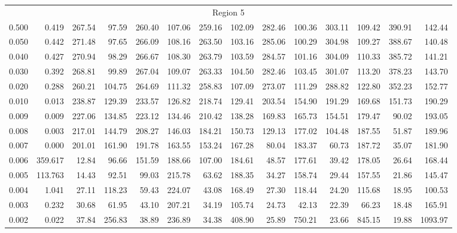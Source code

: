\begin{tabular}{@{}lrrrrrrrrrrrrr@{}}
\midrule
\multicolumn{14}{c}{Region 5} \\
\cmidrule{1-14}
0.500 & 0.419 & 267.54 & 97.59 & 260.40 & 107.06 & 259.16 & 102.09 & 282.46 & 100.36 & 303.11 & 109.42 & 390.91 & 142.44 \\
0.050 & 0.442 & 271.48 & 97.65 & 266.09 & 108.16 & 263.50 & 103.16 & 285.06 & 100.29 & 304.98 & 109.27 & 388.67 & 140.48 \\
0.040 & 0.427 & 270.94 & 98.29 & 266.67 & 108.30 & 263.79 & 103.59 & 284.57 & 101.16 & 304.09 & 110.33 & 385.72 & 141.21 \\
0.030 & 0.392 & 268.81 & 99.89 & 267.04 & 109.07 & 263.33 & 104.50 & 282.46 & 103.45 & 301.07 & 113.20 & 378.23 & 143.70 \\
0.020 & 0.288 & 260.21 & 104.75 & 264.69 & 111.32 & 258.83 & 107.09 & 273.07 & 111.29 & 288.82 & 122.80 & 352.23 & 152.77 \\
0.010 & 0.013 & 238.87 & 129.39 & 233.57 & 126.82 & 218.74 & 129.41 & 203.54 & 154.90 & 191.29 & 169.68 & 151.73 & 190.29 \\
0.009 & 0.009 & 227.06 & 134.85 & 223.12 & 134.46 & 210.42 & 138.28 & 169.83 & 165.73 & 154.51 & 179.47 & 90.02 & 193.05 \\
0.008 & 0.003 & 217.01 & 144.79 & 208.27 & 146.03 & 184.21 & 150.73 & 129.13 & 177.02 & 104.48 & 187.55 & 51.87 & 189.96 \\
0.007 & 0.000 & 201.01 & 161.90 & 191.78 & 163.55 & 153.24 & 167.28 & 80.04 & 183.37 & 60.73 & 187.72 & 35.07 & 181.90 \\
0.006 & 359.617 & 12.84 & 96.66 & 151.59 & 188.66 & 107.00 & 184.61 & 48.57 & 177.61 & 39.42 & 178.05 & 26.64 & 168.44 \\
0.005 & 113.763 & 14.43 & 92.51 & 99.03 & 215.78 & 63.62 & 188.35 & 34.27 & 158.74 & 29.44 & 157.55 & 21.86 & 145.47 \\
0.004 & 1.041 & 27.11 & 118.23 & 59.43 & 224.07 & 43.08 & 168.49 & 27.30 & 118.44 & 24.20 & 115.68 & 18.95 & 100.53 \\
0.003 & 0.232 & 30.68 & 61.95 & 43.10 & 207.21 & 34.19 & 105.74 & 24.73 & 42.13 & 22.39 & 66.23 & 18.48 & 165.91 \\
0.002 & 0.022 & 37.84 & 256.83 & 38.89 & 236.89 & 34.38 & 408.90 & 25.89 & 750.21 & 23.66 & 845.15 & 19.88 & 1093.97 \\


\end{tabular}
